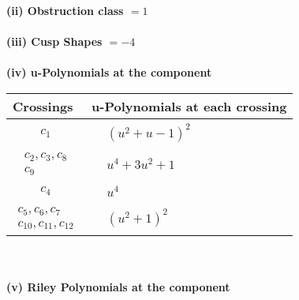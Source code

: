 \documentclass[1p]{elsarticle_modified}
\theoremstyle{definition}
\begin{document}
\flushleft \textbf{(ii) Obstruction class $= 1$}\\~\\
\flushleft \textbf{(iii) Cusp Shapes $= -4$}\\~\\
\newpage\renewcommand{\arraystretch}{1}
\flushleft \textbf{(iv) u-Polynomials at the component}\newline \\
\begin{tabular}{m{50pt}|m{274pt}}
Crossings & \hspace{64pt}u-Polynomials at each crossing \\
\hline $$\begin{aligned}c_{1}\end{aligned}$$&$\begin{aligned}
&(u^2+u-1)^2
\end{aligned}$\\
\hline $$\begin{aligned}c_{2},c_{3},c_{8}\\c_{9}\end{aligned}$$&$\begin{aligned}
&u^4+3 u^2+1
\end{aligned}$\\
\hline $$\begin{aligned}c_{4}\end{aligned}$$&$\begin{aligned}
&u^4
\end{aligned}$\\
\hline $$\begin{aligned}c_{5},c_{6},c_{7}\\c_{10},c_{11},c_{12}\end{aligned}$$&$\begin{aligned}
&(u^2+1)^2
\end{aligned}$\\
\hline
\end{tabular}\\~\\
\newpage\renewcommand{\arraystretch}{1}
\flushleft \textbf{(v) Riley Polynomials at the component}\newline \\
\end{document}
